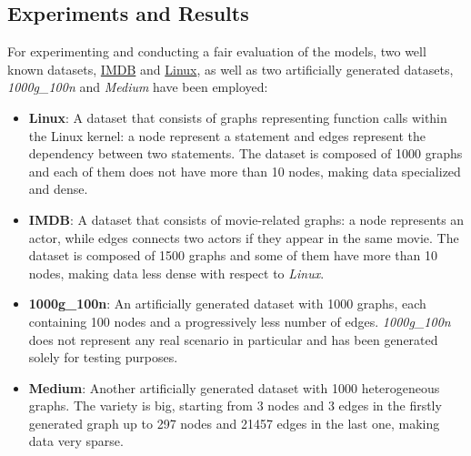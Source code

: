 \documentclass[../Thesis.tex]{subfiles}
\begin{document}
	\subsection{Experiments and Results}
	\label{sec:experiments_results}
	
	For experimenting and conducting a fair evaluation of the models, two well known datasets, \href{https://paperswithcode.com/dataset/imdb-multi}{IMDB} and \href{https://paperswithcode.com/dataset/linux}{Linux}, as well as two artificially generated datasets, \emph{1000g\_100n} and \emph{Medium} have been employed:
	
	\begin{itemize}
		\item \textbf{Linux}: A dataset that consists of graphs representing function calls within the Linux kernel: a node represent a statement and edges represent the dependency between two statements. The dataset is composed of 1000 graphs and each of them does not have more than 10 nodes, making data specialized and dense.
		\item \textbf{IMDB}: A dataset that consists of movie-related graphs: a node represents an actor, while edges connects two actors if they appear in the same movie. The dataset is composed of 1500 graphs and some of them have more than 10 nodes, making data less dense with respect to \emph{Linux}.
		\item \textbf{1000g\_100n}: An artificially generated dataset with 1000 graphs, each containing 100 nodes and a progressively less number of edges. \emph{1000g\_100n} does not represent any real scenario in particular and has been generated solely for testing purposes.
		\item \textbf{Medium}: Another artificially generated dataset with 1000 heterogeneous graphs. The variety is big, starting from 3 nodes and 3 edges in the firstly generated graph up to 297 nodes and 21457 edges in the last one, making data very sparse.
	\end{itemize}
	
\end{document}
